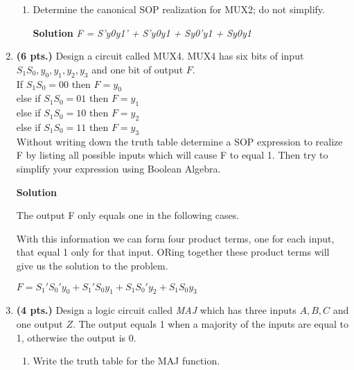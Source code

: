 \begin{enumerate}
\begin{enumerate}
            \item Determine the canonical SOP realization for MUX2;
                do not simplify.

                \begin{onlysolution}  \textbf{Solution} \itshape
                    F = S'y0y1' + S'y0y1 + Sy0'y1 + Sy0y1
                \end{onlysolution}
        \end{enumerate}

    \item \textbf{ (6 pts.)} Design a circuit called MUX4.  MUX4 has six bits of input
        $S_1 S_0, y_0, y_1, y_2, y_3$ and one bit of output $F$.  \\
        If      $S_1 S_0 = 00$ then $F=y_0$  \\
        else if $S_1 S_0 = 01$ then $F=y_1$ \\
        else if $S_1 S_0 = 10$ then $F=y_2$ \\
        else if $S_1 S_0 = 11$ then $F=y_3$ \\
        Without writing down the truth table determine a SOP expression
        to realize F by listing all possible inputs which will cause F to equal 1.
        Then try to simplify your expression using Boolean Algebra.

        \begin{onlysolution}  \textbf{Solution} \itshape

            The output F only equals one in the following cases.

            With this information we can form four product terms, one for each input,
            that equal 1 only for that input.  ORing together these product terms
            will give us the solution to the problem.

            $F = S_1'S_0'y_0 + S_1'S_0 y_1 + S_1 S_0'y_2 + S_1 S_0 y_3$
        \end{onlysolution}

    \item  \textbf{ (4 pts.)} Design a logic circuit called \textit{MAJ} which
        has three inputs $A,B,C$ and one output $Z$. The output equals 1
        when a majority of the inputs are equal to 1, otherwise the output is 0.
        \begin{enumerate}
            \item Write the truth table for the MAJ function.


\end{enumerate}
\end{enumerate}
